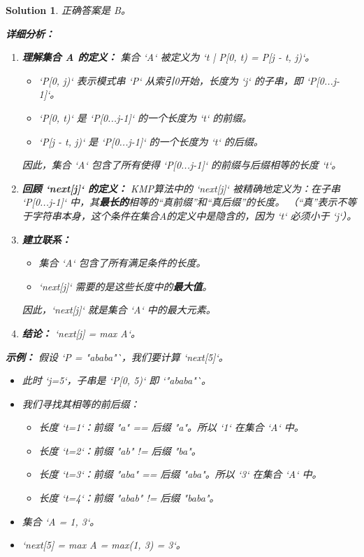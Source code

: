 \documentclass[UTF8]{report}
\newtheorem{solution}{Solution}
\theoremstyle{MyLineTheoremStyle} %
\theoremstyle{MyBlockTheoremStyle} %
\theoremstyle{MySubsubsectionStyle} %
\begin{document}
\begin{solution}
正确答案是 B。

\textbf{详细分析：}

\begin{enumerate}
    \item \textbf{理解集合 A 的定义：}
    集合 `A` 被定义为 `{t | P[0, t) = P[j - t, j)}`。
    \begin{itemize}
        \item `P[0, j)` 表示模式串 `P` 从索引0开始，长度为 `j` 的子串，即 `P[0...j-1]`。
        \item `P[0, t)` 是 `P[0...j-1]` 的一个长度为 `t` 的前缀。
        \item `P[j - t, j)` 是 `P[0...j-1]` 的一个长度为 `t` 的后缀。
    \end{itemize}
    因此，集合 `A` 包含了所有使得 `P[0...j-1]` 的前缀与后缀相等的长度 `t`。

    \item \textbf{回顾 `next[j]` 的定义：}
    KMP算法中的 `next[j]` 被精确地定义为：在子串 `P[0...j-1]` 中，其\textbf{最长的}相等的“真前缀”和“真后缀”的长度。
    （“真”表示不等于字符串本身，这个条件在集合A的定义中是隐含的，因为 `t` 必须小于 `j`）。

    \item \textbf{建立联系：}
    \begin{itemize}
        \item 集合 `A` 包含了所有满足条件的长度。
        \item `next[j]` 需要的是这些长度中的\textbf{最大值}。
    \end{itemize}
    因此，`next[j]` 就是集合 `A` 中的最大元素。

    \item \textbf{结论：}
    `next[j] = max A`。
\end{enumerate}

\textbf{示例：}
假设 `P = "ababa"`，我们要计算 `next[5]`。
\begin{itemize}
    \item 此时 `j=5`，子串是 `P[0, 5)` 即 `"ababa"`。
    \item 我们寻找其相等的前后缀：
    \begin{itemize}
        \item 长度 `t=1`：前缀 "a" == 后缀 "a"。所以 `1` 在集合 `A` 中。
        \item 长度 `t=2`：前缀 "ab" != 后缀 "ba"。
        \item 长度 `t=3`：前缀 "aba" == 后缀 "aba"。所以 `3` 在集合 `A` 中。
        \item 长度 `t=4`：前缀 "abab" != 后缀 "baba"。
    \end{itemize}
    \item 集合 `A = {1, 3}`。
    \item `next[5] = max A = max({1, 3}) = 3`。
\end{itemize}
\end{solution}
\end{document}
